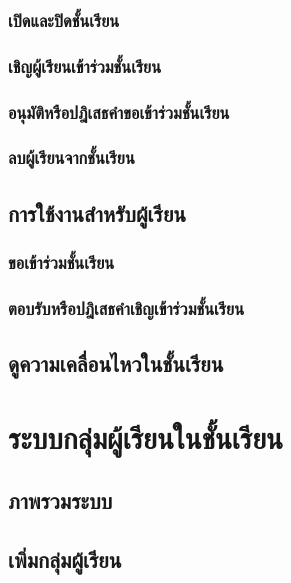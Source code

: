 \documentclass[12pt,oneside]{book}
\begin{document}
\subsection{เปิดและปิดชั้นเรียน}

\subsection{เชิญผู้เรียนเข้าร่วมชั้นเรียน}

\subsection{อนุมัติหรือปฎิเสธคำขอเข้าร่วมชั้นเรียน}

\subsection{ลบผู้เรียนจากชั้นเรียน}

\section{การใช้งานสำหรับผู้เรียน}

\subsection{ขอเข้าร่วมชั้นเรียน}

\subsection{ตอบรับหรือปฎิเสธคำเชิญเข้าร่วมชั้นเรียน}

\section{ดูความเคลื่อนไหวในชั้นเรียน}

\chapter{ระบบกลุ่มผู้เรียนในชั้นเรียน}

\section{ภาพรวมระบบ}

\section{เพิ่มกลุ่มผู้เรียน}
\end{document}
